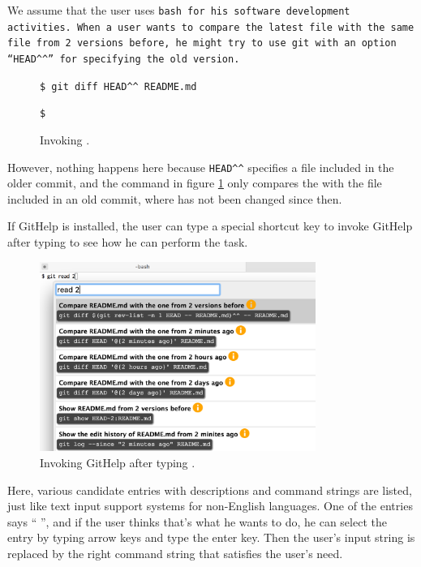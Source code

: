 \documentclass{sigchi}
\def\GH{\textsf{GitHelp}}
\def\GIT{\texttt{git}}
\begin{document}
We assume that the user uses \tt{bash} for his software
development activities.
% 
When a user wants to compare the latest  file
with the same file from 2 versions before,
he might try to use {\GIT} with an option
``{\smallfont\verb|HEAD^^|}''
for specifying the old version.

\begin{figure}[h]
  {\smallfont
  \verb|$ git diff HEAD^^ README.md|
  \par
  \verb|$|
  }
  \caption{Invoking .}
  \label{gitdiff}
\end{figure}


However, nothing happens here because
\verb|HEAD^^|
specifies a file included in the older commit,
and the command in figure \ref{gitdiff} only compares the
 with the file included in an old commit, where
 has not been changed since then.

If {\GH} is installed,
the user can type a special shortcut key
to invoke {\GH} after typing  to see how he can
perform the task.

\begin{figure}[h]
  \includegraphics[width=9cm,bb=0 0 900 600]{figures/example1.png}
  \caption{Invoking {\GH} after typing .}
  \label{example1}
\end{figure}

Here, various candidate entries with
descriptions and command strings are listed,
just like text input support systems for non-English languages.
One of the entries says
``  '',
and if the user thinks that's what he wants to do,
he can select the entry by typing arrow keys and type the enter key.
Then the user's input string is replaced by the right command string
that satisfies the user's need.
\end{document}
